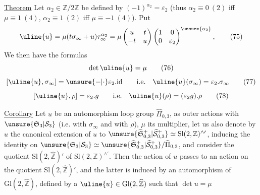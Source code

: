 \uline{Theorem} Let $\alpha_2\in\mathbb Z/2\mathbb Z$ be defined by
$(-1)^{\alpha_2}=\varepsilon_2$
(thus $\alpha_2\equiv0\ (2)$ iff $\mu\equiv1\ (4)$,
$\alpha_2\equiv1\ (2)$ iff
$\mu\equiv-1\ (4)$). Put
\[
\uline{u}=\mu(t\sigma_\infty+u)\tau_\infty^{\alpha_2}
=\mu\begin{pmatrix}u&t\\-t&u\end{pmatrix}
\begin{pmatrix}1&0\\0&\varepsilon_2\end{pmatrix}^{\unsure{\alpha_2}},
\tag{75}
\]
We then have the formulas
\[
\det\uline{u}=\mu
\tag{76}
\]
\[
[\uline{u},\sigma_\infty]=\unsure{-|\cdot}\varepsilon_2.\mathrm{id}
\qquad\text{i.e.}\quad\uline{u}(\sigma_\infty)=\varepsilon_2.\sigma_\infty
\tag{77}
\]
\[
[\uline{u},\rho]=\varepsilon_2.g
\qquad\text{i.e.}\quad\uline{u}(\rho)=(\varepsilon_2g).\rho
\tag{78}
\]

\uline{Corollary} Let $u$ be an automorphism  loop
group $\widehat{\Pi}_{0,3}$,  as outer actions with
$\unsure{\mathfrak S_3|\mathcal S_3}$ (i.e. with $\sigma_\infty$ and with $\rho$), $\mu$
its multiplier, let us also denote by
$u$ the canonical extension of $u$ to
$\unsure{\widehat{\mathfrak S}_{0,3}^{+}|\widehat{\mathcal S}_{0,3}^{+}}
\simeq\mathrm{Sl}(2,\mathbb Z)^{\wedge\prime}$,
inducing the identity on
$\unsure{\mathfrak S_3|\mathcal S_3}
\simeq\unsure{\widehat{\mathfrak S}_{0,3}^{+}|\widehat{\mathcal S}_{0,3}^{+}}/
\widehat{\Pi}_{0,3}$,
and consider the quotient $\mathrm{Sl}(2,\widehat{\mathbb Z})'$ of
$\mathrm{Sl}(2,\mathbb Z)^{\wedge\prime}$. Then the action of $u$ passes
to an action on the quotient $\mathrm{Sl}(2,\widehat{\mathbb Z})'$,
and the latter is induced by an
automorphism of $\mathrm{Gl}(2,\widehat{\mathbb Z})$, defined by a
 $\uline{u}\in\mathrm{Gl}(2,\widehat{\mathbb Z})$
such that $\det u=\mu$

